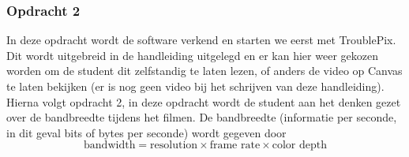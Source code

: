 \documentclass{article}
\begin{document}
\subsubsection{Opdracht 2}
In deze opdracht wordt de software verkend en starten we eerst met TroublePix. Dit wordt uitgebreid in de handleiding uitgelegd en er kan hier weer gekozen worden om de student dit zelfstandig te laten lezen, of anders de video op Canvas te laten bekijken (er is nog geen video bij het schrijven van deze handleiding). Hierna volgt opdracht 2, in deze opdracht wordt de student aan het denken gezet over de bandbreedte tijdens het filmen. De bandbreedte (informatie per seconde, in dit geval bits of bytes per seconde) wordt gegeven door
\begin{equation}\label{eq:1}
    \text{bandwidth} = \text{resolution} \times \text{frame rate} \times \text{color depth}
\end{equation}
\end{document}
